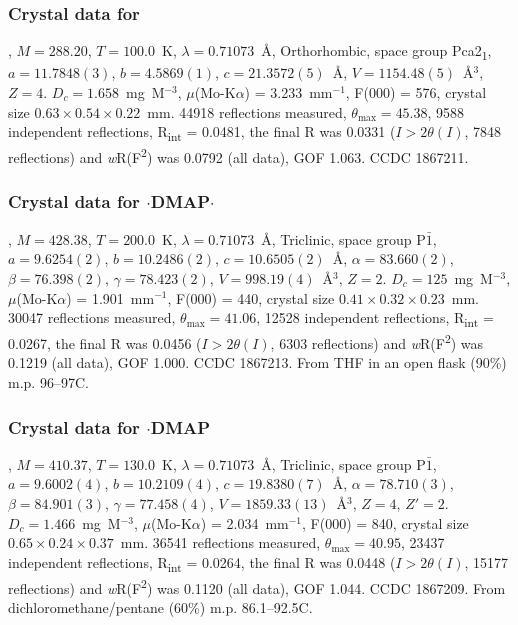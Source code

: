 \subsubsection{Crystal data for }
, $M=288.20$, $T=100.0$~K, $\lambda=0.71073$~\AA, Orthorhombic, space group Pca2\textsubscript{1}, $a = 11.7848(3)$, $b = 4.5869(1)$, $c = 21.3572(5)$~\AA, $V = 1154.48(5)$~\AA$^{3}$, $Z = 4$.
$D_{c}= 1.658$~mg~M$^{-3}$, $\mu$(Mo-K$\alpha$) = 3.233~mm$^{-1}$, F(000) = 576, crystal size $0.63 \times 0.54 \times 0.22$~mm.
44918 reflections measured, $\theta_{\mathrm{max}}=45.38$\degree, 9588 independent reflections, R\textsubscript{int} = 0.0481, the final R was 0.0331 ($I > 2\theta(I)$, 7848 reflections) and \emph{w}R(F\textsuperscript{2}) was 0.0792 (all data), GOF 1.063. 
CCDC 1867211. 

\subsubsection{Crystal data for $\cdot$DMAP$\cdot$}
, $M=428.38$, $T=200.0$~K, $\lambda=0.71073$~\AA, Triclinic, space group P$\bar{1}$, $a = 9.6254(2)$, $b = 10.2486(2)$, $c = 10.6505(2)$~\AA, $\alpha = 83.660(2)$\degree, $\beta = 76.398(2)$\degree, $\gamma = 78.423(2)$\degree, $V = 998.19(4)$~\AA$^{3}$, $Z = 2$.
$D_{c}= 125$~mg~M$^{-3}$, $\mu$(Mo-K$\alpha$) = 1.901~mm$^{-1}$, F(000) = 440, crystal size $0.41 \times 0.32 \times 0.23$~mm.
30047 reflections measured, $\theta_{\mathrm{max}} = 41.06$\degree, 12528 independent reflections, R\textsubscript{int} = 0.0267, the final R was 0.0456 ($I > 2\theta(I)$, 6303 reflections) and \emph{w}R(F\textsuperscript{2}) was 0.1219 (all data), GOF 1.000. 
CCDC 1867213. 
From THF in an open flask (90\%) m.p. 96--97\degree C.

\subsubsection{Crystal data for $\cdot$DMAP}
, $M=410.37$, $T=130.0$~K, $\lambda=0.71073$~\AA, Triclinic, space group P$\bar{1}$, $a = 9.6002(4)$, $b = 10.2109(4)$, $c = 19.8380(7)$~\AA, $\alpha = 78.710(3)$\degree, $\beta = 84.901(3)$\degree, $\gamma = 77.458(4)$\degree, $V = 1859.33(13)$~\AA$^{3}$, $Z = 4$, $Z\prime = 2$.
$D_{c}= 1.466$~mg~M$^{-3}$, $\mu$(Mo-K$\alpha$) = 2.034~mm$^{-1}$, F(000) = 840, crystal size $0.65 \times 0.24 \times 0.37$~mm.
36541 reflections measured, $\theta_{\mathrm{max}} = 40.95$\degree, 23437 independent reflections, R\textsubscript{int} = 0.0264, the final R was 0.0448 ($I > 2\theta(I)$, 15177 reflections) and \emph{w}R(F\textsuperscript{2}) was 0.1120 (all data), GOF 1.044. 
CCDC 1867209. 
From dichloromethane/pentane (60\%) m.p. 86.1--92.5\degree C.

